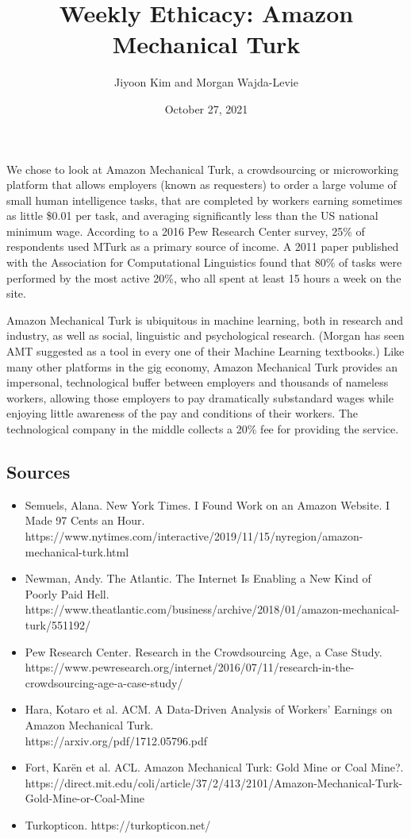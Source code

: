 \documentclass{article}
\author{Jiyoon Kim and Morgan Wajda-Levie}
\date{October 27, 2021}
\title{Weekly Ethicacy: Amazon Mechanical Turk}
\begin{document}
\maketitle

We chose to look at Amazon Mechanical Turk, a crowdsourcing or
microworking platform that allows employers (known as requesters) to
order a large volume of small human intelligence tasks, that are
completed by workers earning sometimes as little \$0.01 per task, and
averaging significantly less than the US national minimum wage.
According to a 2016 Pew Research Center survey, 25\% of respondents used
MTurk as a primary source of income. A 2011 paper published with the
Association for Computational Linguistics found that 80\% of tasks were
performed by the most active 20\%, who all spent at least 15 hours a
week on the site.

Amazon Mechanical Turk is ubiquitous in machine learning, both in
research and industry, as well as social, linguistic and psychological
research. (Morgan has seen AMT suggested as a tool in every one of their
Machine Learning textbooks.) Like many other platforms in the gig
economy, Amazon Mechanical Turk provides an impersonal, technological
buffer between employers and thousands of nameless workers, allowing
those employers to pay dramatically substandard wages while enjoying
little awareness of the pay and conditions of their workers. The
technological company in the middle collects a 20\% fee for providing
the service.

\subsection*{Sources}
\begin{itemize}
    \item Semuels, Alana. New York Times. I Found Work on an Amazon
        Website. I Made 97 Cents an Hour.
        \\https://www.nytimes.com/interactive/2019/11/15/nyregion/amazon-mechanical-turk.html
    \item Newman, Andy. The Atlantic. The Internet Is Enabling a New
        Kind of Poorly Paid Hell.
        \\ https://www.theatlantic.com/business/archive/2018/01/amazon-mechanical-turk/551192/
    \item Pew Research Center. Research in the Crowdsourcing Age, a Case
        Study.
        \\ https://www.pewresearch.org/internet/2016/07/11/research-in-the-crowdsourcing-age-a-case-study/
    \item Hara, Kotaro et al. ACM. A Data-Driven Analysis of Workers’
        Earnings on Amazon Mechanical Turk.
        \\https://arxiv.org/pdf/1712.05796.pdf
    \item Fort, Karën et al. ACL. Amazon Mechanical Turk: Gold Mine or
        Coal Mine?.
        \\https://direct.mit.edu/coli/article/37/2/413/2101/Amazon-Mechanical-Turk-Gold-Mine-or-Coal-Mine
    \item Turkopticon. https://turkopticon.net/
\end{itemize}
\end{document}
